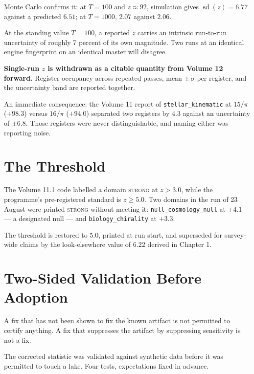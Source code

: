 \documentclass[11pt, letterpaper, openany]{book}
\begin{document}
Monte Carlo confirms it: at $T = 100$ and $z \approx 92$, simulation gives
$\operatorname{sd}(z) = 6.77$ against a predicted $6.51$; at $T = 1000$, $2.07$ against $2.06$.

\begin{warningbox}
At the standing value $T = 100$, a reported $z$ carries an intrinsic run-to-run uncertainty of
roughly 7 percent of its own magnitude. Two runs at an identical engine fingerprint on an
identical master will disagree.

\medskip
\noindent \textbf{Single-run $z$ is withdrawn as a citable quantity from Volume 12 forward.}
Register occupancy across repeated passes, mean $\pm\,\sigma$ per register, and the uncertainty
band are reported together.
\end{warningbox}

An immediate consequence: the Volume 11 report of \texttt{stellar\_kinematic} at $15/\pi$
($+98.3$) versus $16/\pi$ ($+94.0$) separated two registers by $4.3$ against an uncertainty of
$\pm 6.8$. Those registers were never distinguishable, and naming either was reporting noise.

\section{The Threshold}

The Volume 11.1 code labelled a domain \textsc{strong} at $z > 3.0$, while the programme's
pre-registered standard is $z \geq 5.0$. Two domains in the run of 23 August were printed
\textsc{strong} without meeting it: \texttt{null\_cosmology\_null} at $+4.1$ --- a designated
null --- and \texttt{biology\_chirality} at $+3.3$.

The threshold is restored to $5.0$, printed at run start, and superseded for survey-wide claims
by the look-elsewhere value of $6.22$ derived in Chapter 1.

\section{Two-Sided Validation Before Adoption}

\begin{rulingbox}
A fix that has not been shown to fix the known artifact is not permitted to certify anything.
A fix that suppresses the artifact by suppressing sensitivity is not a fix.
\end{rulingbox}

The corrected statistic was validated against synthetic data before it was permitted to touch a
lake. Four tests, expectations fixed in advance.
\end{document}
